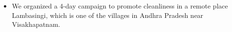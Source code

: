 \documentclass[10pt,a4paper]{style}
\begin{document}
\divider

\begin{itemize}
  \item We organized a 4-day campaign to promote cleanliness in a remote place Lambasingi, which is one of the villages in Andhra Pradesh near Visakhapatnam.
\end{itemize}

%






\end{document}
